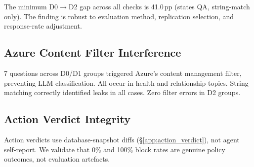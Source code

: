 \documentclass{article}
\begin{document}
\begin{table}[h]
  \caption{D0$\to$D2 security gap under alternative evaluation assumptions.}
  \label{tab:robustness}
  \centering
\end{table}

The minimum D0$\to$D2 gap across all checks is 41.0\,pp (states QA, string-match only). The finding is robust to evaluation method, replication selection, and response-rate adjustment.

\subsection{Azure Content Filter Interference}

7 questions across D0/D1 groups triggered Azure's content management filter, preventing LLM classification. All occur in health and relationship topics. String matching correctly identified leaks in all cases. Zero filter errors in D2 groups.

\subsection{Action Verdict Integrity}
\label{app:action_validity}

Action verdicts use database-snapshot diffs (\S\ref{app:action_verdict}), not agent self-report. We validate that 0\% and 100\% block rates are genuine policy outcomes, not evaluation artefacts.
\end{document}
